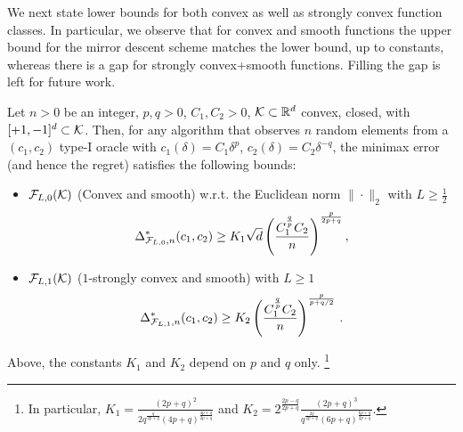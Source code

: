 We next state lower bounds for both convex as well as strongly convex function classes. In particular, we observe that for convex and smooth functions the upper bound for the mirror descent scheme matches the lower bound, up to constants, whereas there is a gap for strongly convex+smooth functions.
Filling the gap is left for future work.
\begin{theorem}
\label{thm:lb-convex}
Let $n>0$ be an integer, $p,q>0$, $C_1,C_2>0$, 
$\mathcal{K}\subset \mathbb{R}^d$ convex, closed, with  $[+1,-1]^d\subset \mathcal{K}$.
Then, for any algorithm that observes $n$ random elements from a $(c_1,c_2)$ type-I oracle 
 with $c_1(\delta) = C_1 \delta^p$, $c_2(\delta) = C_2 \delta^{-q}$,
 the minimax error (and hence the regret) satisfies the following bounds:
 \begin{itemize}
 \item
${\mathcal{F}_{L,0}(\mathcal{K})}$ (Convex and smooth) w.r.t. the Euclidean norm $\|\cdot\|_2$ with $L\ge \frac12$
\[
 \Delta_{\mathcal{F}_{L,0},n}^{*}(c_1,c_2) \ge K_1\sqrt{d}\left(\dfrac{C_1^{\frac{q}{p}}C_2}{n}\right)^{\frac{p}{2p+q}},
\]
\item
${\mathcal{F}_{L,1}(\mathcal{K})}$ ($1$-strongly convex and smooth) with $L\ge 1$
\[
\Delta_{\mathcal{F}_{L,1}, n}^{*}(c_1,c_2) \ge K_2 \left(\dfrac{C_1^{\frac{q}{p}} C_2}{n} \right)^{\frac{p}{p+q/2}}\,.
\]
\end{itemize}
Above,
the constants $K_1$ and $K_2$ depend on $p$ and $q$ only.%
\footnote{
In particular,
$K_1= \frac{\left(2p+q\right)^2}{2q^{\frac{q}{2p+q}}\left(4p+q\right)^{\frac{4p+q}{2p+q}}}$
and
$K_2= 2^{\frac{2p-q}{2p+q}} \frac{(2p+q)^3}{q^{\frac{2q}{2p+q}}(6p+q)^{\frac{6p+q}{2p+q}}}$.}
\end{theorem}
